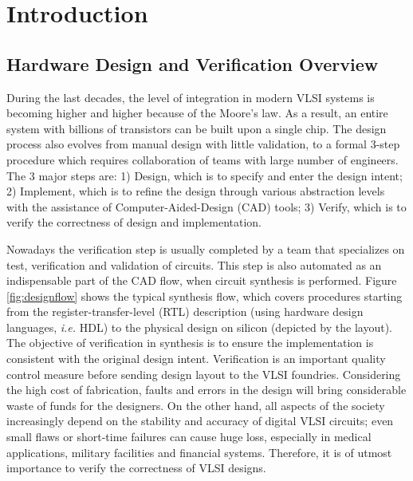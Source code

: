 \chapter{Introduction}
\label{ch:intro}





\section{Hardware Design and Verification Overview}
During the last decades, the level of integration in modern VLSI systems is becoming higher and higher because of the Moore's law.
As a result, an entire system with billions of transistors can be built upon a single chip.
The design process also evolves from manual design with little validation, to 
a formal 3-step procedure which requires collaboration of teams with large number of 
engineers. The 3 major steps are: 1) Design, which is to specify and enter the design intent;
2) Implement, which is to refine the design through various abstraction levels with the assistance of Computer-Aided-Design (CAD)
tools; 3) Verify, which is to verify the correctness of design and implementation.

Nowadays the verification step is usually completed by a team that specializes on test, verification and validation of 
circuits. This step is also automated as an indispensable part of the CAD flow, when circuit synthesis is performed. 
Figure \ref{fig:designflow} shows the typical synthesis flow, which covers procedures starting from the 
register-transfer-level (RTL) description (using hardware design languages, {\it i.e.} HDL) to  the 
physical design on silicon (depicted by the layout). The objective of verification in synthesis is 
to ensure the implementation is consistent with the original design intent. Verification is 
an important quality control measure before sending design layout to the VLSI foundries.
Considering the high cost of fabrication, faults and errors in the design will bring considerable 
waste of funds for the designers. On the other hand, all aspects of the society increasingly depend on 
the stability and accuracy of digital VLSI circuits; even small flaws or short-time failures can cause 
huge loss, especially in medical applications, military facilities and financial systems.
Therefore, it is of utmost importance to verify the correctness of VLSI designs.

